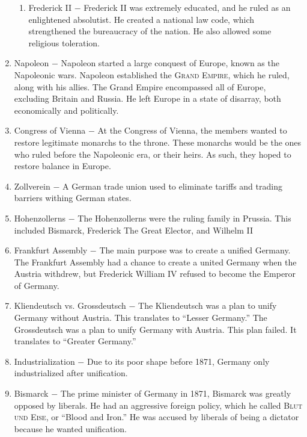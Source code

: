 \documentclass[12pt]{article}
\begin{document}
\begin{enumerate}
\begin{enumerate}[label=\arabic{*}.]
\item Frederick II $-$ Frederick II was extremely educated, and he ruled as an enlightened absolutist. He created a national law code, which strengthened the bureaucracy of the nation. He also allowed some religious toleration.

\end{enumerate}
\setcounter{enumi}{514}

\item Napoleon $-$ Napoleon started a large conquest of Europe, known as the Napoleonic wars. Napoleon established the \textsc{Grand Empire}, which he ruled, along with his allies. The Grand Empire encompassed all of Europe, excluding Britain and Russia. He left Europe in a state of disarray, both economically and politically. 

\item Congress of Vienna $-$ At the Congress of Vienna, the members wanted to restore legitimate monarchs to the throne. These monarchs would be the ones who ruled before the Napoleonic era, or their heirs. As such, they hoped to restore balance in Europe.

\item Zollverein $-$ A German trade union used to eliminate tariffs and trading barriers withing German states.

\item Hohenzollerns $-$ The Hohenzollerns were the ruling family in Prussia. This included Bismarck, Frederick The Great Elector, and Wilhelm II

\item Frankfurt Assembly $-$ The main purpose was to create a unified Germany. The Frankfurt Assembly had a chance to create a united Germany when the Austria withdrew, but Frederick William IV refused to become the Emperor of Germany.

\item Kliendeutsch vs. Grossdeutsch $-$ The Kliendeutsch was a plan to unify Germany without Austria. This translates to ``Lesser Germany.'' The Grossdeutsch was a plan to unify Germany with Austria. This plan failed. It translates to ``Greater Germany.''

\item Industrialization $-$ Due to its poor shape before 1871, Germany only industrialized after unification.

\item Bismarck $-$ The prime minister of Germany in 1871, Bismarck was greatly opposed by liberals. He had an aggressive foreign policy, which he called \textsc{Blut und Eise}, or ``Blood and Iron.'' He was accused by liberals of being a dictator because he wanted unification.


\end{enumerate}
\end{document}

